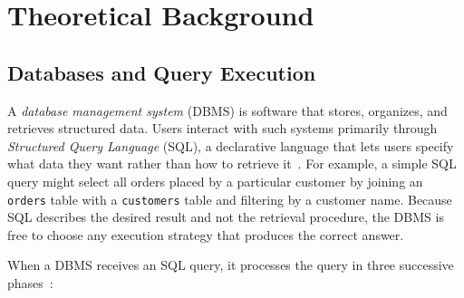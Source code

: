 
\chapter{Theoretical Background}\label{chapter:theoretical_background}

\section{Databases and Query Execution}\label{sec:databases_and_query_execution}

A \emph{database management system} (DBMS) is software that stores, organizes, and retrieves structured data.
Users interact with such systems primarily through \emph{Structured Query Language} (SQL), 
a declarative language that lets users specify what data they want rather than how to retrieve it~\parencite{silberschatz2019}.
For example, a simple SQL query might select all orders placed by a particular customer by joining an \texttt{orders} table with a \texttt{customers} table and filtering by a customer name.
Because SQL describes the desired result and not the retrieval procedure, the DBMS is free to choose any execution strategy that produces the correct answer.

When a DBMS receives an SQL query, it processes the query in three successive phases~\parencite{silberschatz2019}:

